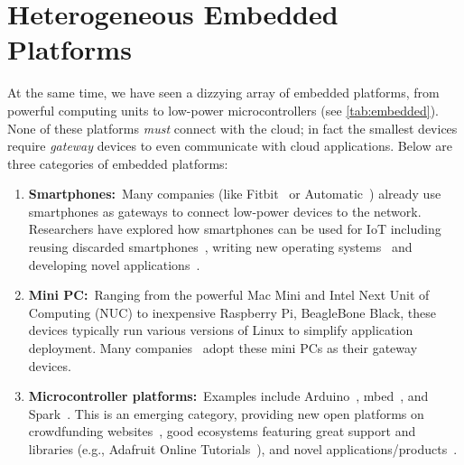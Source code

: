 \section{Heterogeneous Embedded Platforms}
\label{sec:embedded-platforms}

At the same time, we have seen a dizzying array of embedded platforms, from
powerful computing units to low-power microcontrollers (see
\autoref{tab:embedded}). None of these platforms \emph{must} connect with the
cloud; in fact the smallest devices require \emph{gateway} devices to even
communicate with cloud applications. Below are three categories of embedded
platforms:

\begin{enumerate}
\item \textbf{Smartphones:}~Many companies (like Fitbit~\cite{fitbit} or
  Automatic~\cite{automatic}) already use smartphones as gateways to connect
  low-power devices to the network.  Researchers have explored how smartphones
  can be used for IoT including reusing discarded
  smartphones~\cite{challen2014mote}, writing new operating systems~\cite{janos}
  and developing novel applications~\cite{hong2014smartphone}.

\item \textbf{Mini PC:}~Ranging from the powerful Mac Mini and Intel Next Unit
  of Computing (NUC) to inexpensive Raspberry Pi, BeagleBone Black, these
  devices typically run various versions of Linux to simplify application
  deployment.  Many companies~\cite{ninja, smartthings, wink} adopt these mini
  PCs as their gateway devices.

\item \textbf{Microcontroller platforms:}~Examples include
  Arduino~\cite{arduino}, mbed~\cite{mbed}, and Spark~\cite{spark}. This is an
  emerging category, providing new open platforms on crowdfunding
  websites~\cite{kickstarter}, good ecosystems featuring great support and
  libraries (e.g., Adafruit Online Tutorials~\cite{adafruit}), and novel
  applications/products~\cite{iotlist}.

\end{enumerate}

